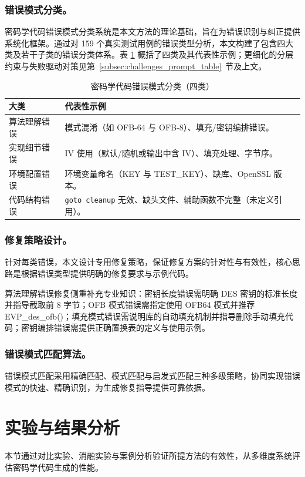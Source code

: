 \documentclass[12pt]{llncs}
\begin{document}
\subsubsection{错误模式分类。}
密码学代码错误模式分类系统是本文方法的理论基础，旨在为错误识别与纠正提供系统化框架。通过对 159 个真实测试用例的错误类型分析，本文构建了包含四大类及若干子类的错误分类体系。表 \ref{tab:error_classification} 概括了四类及其代表性示例；更细化的分层约束与失败驱动对策见第~\ref{subsec:challenges_prompt_table}~节及上文。
\begin{table}[htbp]
  \centering
  \footnotesize
  \caption{密码学代码错误模式分类（四类）}
  \label{tab:error_classification}
  \setlength{\tabcolsep}{6pt}
  \begin{tabular}{p{}p{}}
    \toprule
    大类 & 代表性示例 \\
    \midrule
    算法理解错误 & 模式混淆（如 OFB-64 与 OFB-8）、填充/密钥编排错误。 \\
    实现细节错误 & IV 使用（默认/随机或输出中含 IV）、填充处理、字节序。 \\
    环境配置错误 & 环境变量命名（KEY 与 TEST\_KEY）、缺库、OpenSSL 版本。 \\
    代码结构错误 & \texttt{goto cleanup} 无效、缺头文件、辅助函数不完整（未定义引用）。 \\
    \bottomrule
  \end{tabular}
\end{table}

\subsubsection{修复策略设计。}
针对每类错误，本文设计专用修复策略，保证修复方案的针对性与有效性，核心思路是根据错误类型提供明确的修复要求与示例代码。

算法理解错误修复侧重补充专业知识：密钥长度错误需明确 DES 密钥的标准长度并指导截取前 8 字节；OFB 模式错误需指定使用 OFB64 模式并推荐 EVP\_des\_ofb()；填充模式错误需说明库的自动填充机制并指导删除手动填充代码；密钥编排错误需提供正确置换表的定义与使用示例。

\subsubsection{错误模式匹配算法。}
错误模式匹配采用精确匹配、模式匹配与启发式匹配三种多级策略，协同实现错误模式的快速、精确识别，为生成修复指导提供可靠依据。

\section{实验与结果分析}
本节通过对比实验、消融实验与案例分析验证所提方法的有效性，从多维度系统评估密码学代码生成的性能。
\end{document}
